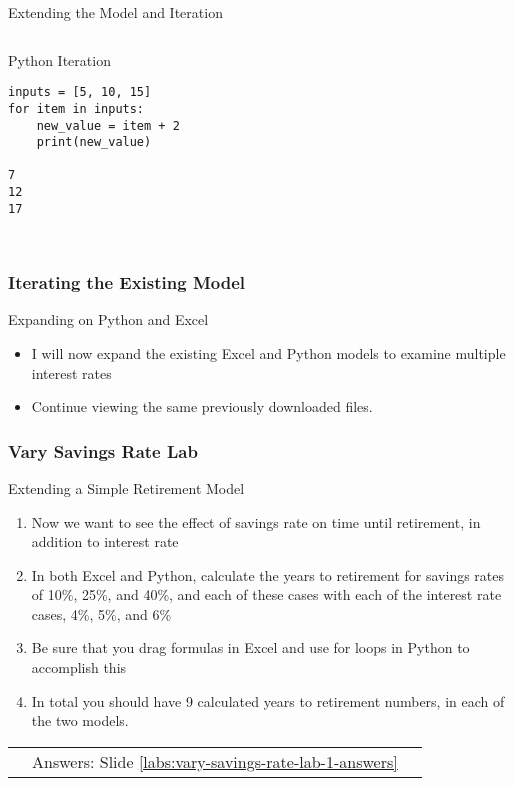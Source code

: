 \documentclass[handout, 11pt]{beamer}
\begin{document}
\begin{section}{Extending the Model and Iteration}
\begin{frame}[fragile]
\begin{columns}
\begin{column}{0.5\textwidth}
{\begin{block}{Python Iteration}
\begin{verbatim}
inputs = [5, 10, 15]
for item in inputs:
    new_value = item + 2
    print(new_value)

7
12
17
        
\end{verbatim}
\end{block}}
\end{column}
\end{columns}
\end{frame}
\begin{frame}
\frametitle{Iterating the Existing Model}
{
\begin{block}{Expanding on Python and Excel}
\begin{itemize}
\item I will now expand the existing Excel and Python models to examine multiple interest rates
\item Continue viewing the same previously downloaded files.
\end{itemize}
\end{block}
}
\end{frame}
\begin{frame}
\frametitle{Vary Savings Rate Lab}
{
\begin{block}{Extending a Simple Retirement Model}
\begin{enumerate}
\item Now we want to see the effect of savings rate on time until retirement, in addition to interest rate
\item In both Excel and Python, calculate the years to retirement for savings rates of 10\%, 25\%, and 40\%, and each of these cases with each of the interest rate cases, 4\%, 5\%, and 6\%
\item Be sure that you drag formulas in Excel and use for loops in Python to accomplish this
\item In total you should have 9 calculated years to retirement numbers, in each of the two models.
\end{enumerate}
\vfill
\begin{tabular*}{\textwidth}{@{\extracolsep{\fill}}ccc}
\toprule
\hfill & Answers: Slide \textcolor{blue}{\underline{\ref{labs:vary-savings-rate-lab-1-answers}}} & \hfill\\

\end{tabular*}
\end{block}
}
\label{labs:vary-savings-rate-lab-1}
\end{frame}
\end{section}
\end{document}
